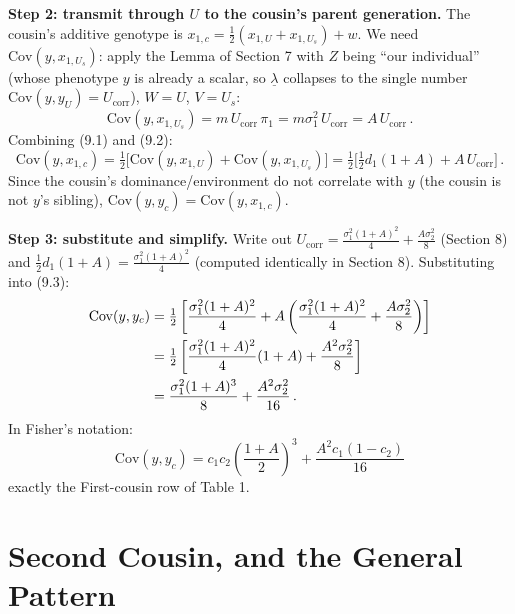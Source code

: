 \documentclass[12pt]{article}
\begin{document}
\textbf{Step 2: transmit through $U$ to the cousin's parent generation.} The cousin's additive genotype is $x_{1,c}=\tfrac12(x_{1,U}+x_{1,U_s})+w$. We need $\mathrm{Cov}(y,x_{1,U_s})$: apply the Lemma of Section 7 with $Z$ being ``our individual'' (whose phenotype $y$ is already a scalar, so $\underline\lambda$ collapses to the single number $\mathrm{Cov}(y,y_U)=U_{\mathrm{corr}}$), $W=U$, $V=U_s$:
\begin{equation}
\mathrm{Cov}(y,x_{1,U_s}) = m\,U_{\mathrm{corr}}\,\pi_1 = m\sigma_1^2\,U_{\mathrm{corr}} = A\,U_{\mathrm{corr}} \, . \tag{9.2}
\end{equation}
Combining (9.1) and (9.2):
\begin{equation}
\mathrm{Cov}(y,x_{1,c}) = \tfrac12\big[\mathrm{Cov}(y,x_{1,U}) + \mathrm{Cov}(y,x_{1,U_s})\big] = \tfrac12\Big[\tfrac12d_1(1+A) + A\,U_{\mathrm{corr}}\Big] \, . \tag{9.3}
\end{equation}
Since the cousin's dominance/environment do not correlate with $y$ (the cousin is not $y$'s sibling), $\mathrm{Cov}(y,y_c)=\mathrm{Cov}(y,x_{1,c})$.

\textbf{Step 3: substitute and simplify.} Write out $U_{\mathrm{corr}}=\tfrac{\sigma_1^2(1+A)^2}{4}+\tfrac{A\sigma_2^2}{8}$ (Section 8) and $\tfrac12d_1(1+A)=\tfrac{\sigma_1^2(1+A)^2}{4}$ (computed identically in Section 8). Substituting into (9.3):
\begin{align}
\mathrm{Cov}(y,y_c) &= \tfrac12\left[\frac{\sigma_1^2(1+A)^2}{4} + A\left(\frac{\sigma_1^2(1+A)^2}{4}+\frac{A\sigma_2^2}{8}\right)\right] \notag \\
&= \tfrac12\left[\frac{\sigma_1^2(1+A)^2}{4}(1+A) + \frac{A^2\sigma_2^2}{8}\right] \notag \\
&= \frac{\sigma_1^2(1+A)^3}{8} + \frac{A^2\sigma_2^2}{16} \, .
\end{align}
In Fisher's notation:
\begin{equation}
\boxed{\mathrm{Cov}(y,y_c) = c_1c_2\left(\frac{1+A}{2}\right)^3 + \frac{A^2c_1(1-c_2)}{16}}
\end{equation}
exactly the First-cousin row of Table 1.

\section{Second Cousin, and the General Pattern}
\end{document}
